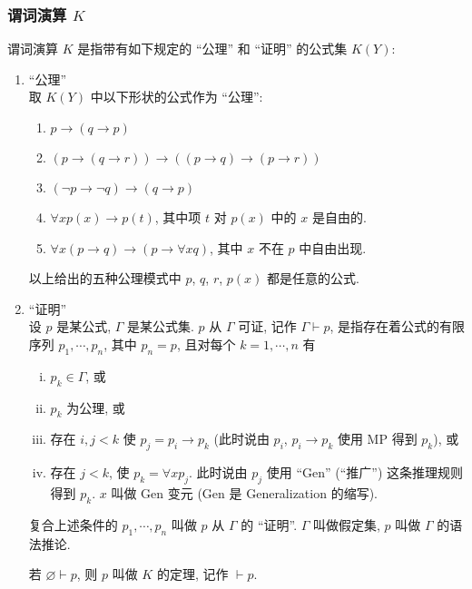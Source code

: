 \documentclass[
    color=black,
    device=normal,
    lang=cn
]{elegantnote}
\begin{document}
\subsubsection{谓词演算 \texorpdfstring{$K$}{K}}
\begin{definition}[谓词演算 $K$]
    谓词演算 $K$ 是指带有如下规定的 ``公理'' 和 ``证明'' 的公式集 $K(Y)$:
    \begin{enumerate}[label = $\arabic*^\circ$]
        \item ``公理''\\
              取 $K(Y)$ 中以下形状的公式作为 ``公理'':
              \begin{enumerate}[label = (K\arabic*)]
                  \item $p\to (q\to p)$
                  \item $(p\to (q\to r))\to ((p\to q)\to (p\to r))$
                  \item $(\lnot p\to \lnot q)\to (q\to p)$
                  \item $\forall xp(x)\to p(t)$, 其中项 $t$ 对 $p(x)$ 中的 $x$ 是自由的.
                  \item $\forall x(p\to q)\to (p\to \forall xq)$, 其中 $x$ 不在 $p$ 中自由出现.
              \end{enumerate}
              以上给出的五种公理模式中 $p$, $q$, $r$, $p(x)$ 都是任意的公式.
        \item ``证明''\\
              设 $p$ 是某公式, $\Gamma$ 是某公式集. $p$ 从 $\Gamma$ 可证, 记作 $\Gamma\vdash p$, 是指存在着公式的有限序列 $p_1, \cdots, p_n$, 其中 $p_n = p$, 且对每个 $k=1, \cdots, n$ 有
              \begin{enumerate}[(i)]
                  \item $p_k\in \Gamma$, 或
                  \item $p_k$ 为公理, 或
                  \item 存在 $i, j <k$ 使 $p_j=p_i\to p_k$ (此时说由 $p_i$, $p_i\to p_k$ 使用 MP 得到 $p_k$), 或
                  \item 存在 $j<k$, 使 $p_k = \forall xp_j$. 此时说由 $p_j$ 使用 ``Gen'' (``推广'') 这条推理规则得到 $p_k$. $x$ 叫做 Gen 变元 (Gen 是 Generalization 的缩写).
              \end{enumerate}
              复合上述条件的 $p_1, \cdots, p_n$ 叫做 $p$ 从 $\Gamma$ 的 ``证明''. $\Gamma$ 叫做假定集, $p$ 叫做 $\Gamma$ 的语法推论.

              若 $\varnothing\vdash p$, 则 $p$ 叫做 $K$ 的定理, 记作 $\vdash p$.
    \end{enumerate}
\end{definition}
\end{document}
